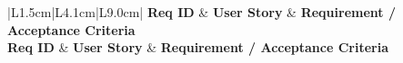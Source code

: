 \documentclass[11pt,a4paper]{article}
\begin{document}
\small
\begin{longtable}{|L{1.5cm}|L{4.1cm}|L{9.0cm}|}
	\hline
	\textbf{Req ID} & \textbf{User Story}                                                                                                    & \textbf{Requirement / Acceptance Criteria}                                                                                                                                                                                                                                                                                                                                                                                                                                                                                                                                                                       \\
	\hline
	\endfirsthead
	\hline
	\textbf{Req ID} & \textbf{User Story}                                                                                                    & \textbf{Requirement / Acceptance Criteria}                                                                                                                                                                                                                                                                                                                                                                                                                                                                                                                                                                       \\
	\hline
	\endhead


\end{longtable}
\end{document}
